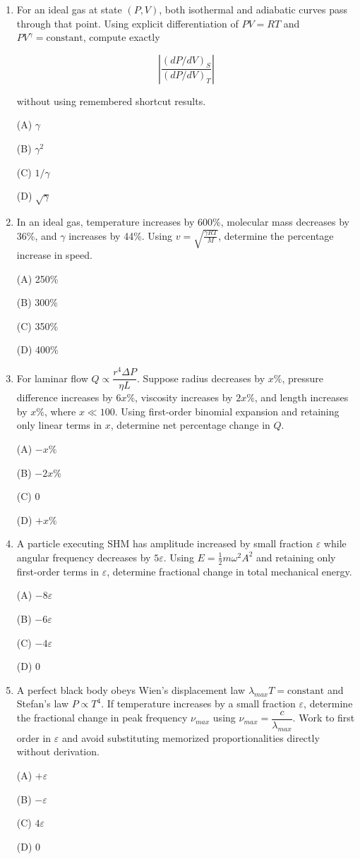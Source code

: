 \documentclass[12pt]{article}
\begin{document}
\begin{enumerate}
(D) 720896  

\item For an ideal gas at state $(P,V)$, both isothermal and adiabatic curves pass through that point. Using explicit differentiation of $PV=RT$ and $PV^\gamma=\text{constant}$, compute exactly  

\[
\left|\frac{(dP/dV)_S}{(dP/dV)_T}\right|
\]

without using remembered shortcut results.

(A) $\gamma$  

(B) $\gamma^2$  

(C) $1/\gamma$  

(D) $\sqrt{\gamma}$  

\item In an ideal gas, temperature increases by 600\%, molecular mass decreases by 36\%, and $\gamma$ increases by 44\%. Using $v=\sqrt{\frac{\gamma RT}{M}}$, determine the percentage increase in speed.

(A) 250\%  

(B) 300\%  

(C) 350\%  

(D) 400\%  

\item For laminar flow $Q\propto\dfrac{r^4\Delta P}{\eta L}$. Suppose radius decreases by $x\%$, pressure difference increases by $6x\%$, viscosity increases by $2x\%$, and length increases by $x\%$, where $x\ll100$. Using first-order binomial expansion and retaining only linear terms in $x$, determine net percentage change in $Q$.

(A) $-x\%$ 

(B) $-2x\%$  

(C) 0  

(D) $+x\%$  

\item A particle executing SHM has amplitude increased by small fraction $\varepsilon$ while angular frequency decreases by $5\varepsilon$. Using $E=\frac12 m\omega^2A^2$ and retaining only first-order terms in $\varepsilon$, determine fractional change in total mechanical energy.

(A) $-8\varepsilon$  

(B) $-6\varepsilon$  

(C) $-4\varepsilon$  

(D) 0  

\item A perfect black body obeys Wien’s displacement law $\lambda_{max}T=\text{constant}$ and Stefan’s law $P\propto T^4$. If temperature increases by a small fraction $\varepsilon$, determine the fractional change in peak frequency $\nu_{max}$ using $\nu_{max}=\dfrac{c}{\lambda_{max}}$. Work to first order in $\varepsilon$ and avoid substituting memorized proportionalities directly without derivation.

(A) $+\varepsilon$  

(B) $-\varepsilon$  

(C) $4\varepsilon$  

(D) 0  

\end{enumerate}
\end{document}
